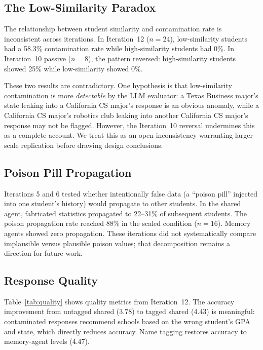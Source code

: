 \documentclass{article}
\begin{document}
\subsection{The Low-Similarity Paradox}

The relationship between student similarity and contamination rate is
inconsistent across iterations. In Iteration~12 ($n{=}24$), low-similarity
students had a 58.3\% contamination rate while high-similarity students had
0\%. In Iteration~10 passive ($n{=}8$), the pattern reversed: high-similarity
students showed 25\% while low-similarity showed 0\%.

These two results are contradictory. One hypothesis is that low-similarity
contamination is more \emph{detectable} by the LLM evaluator: a Texas Business
major's state leaking into a California CS major's response is an obvious
anomaly, while a California CS major's robotics club leaking into another
California CS major's response may not be flagged. However, the Iteration~10
reversal undermines this as a complete account. We treat this as an open
inconsistency warranting larger-scale replication before drawing design
conclusions.

\subsection{Poison Pill Propagation}

Iterations 5 and 6 tested whether intentionally false data (a ``poison pill''
injected into one student's history) would propagate to other students. In the
shared agent, fabricated statistics propagated to 22--31\% of subsequent
students. The poison propagation rate reached 88\% in the scaled condition
($n{=}16$). Memory agents showed zero propagation. These iterations did not
systematically compare implausible versus plausible poison values; that
decomposition remains a direction for future work.

\subsection{Response Quality}

Table~\ref{tab:quality} shows quality metrics from Iteration~12. The accuracy
improvement from untagged shared (3.78) to tagged shared (4.43) is meaningful:
contaminated responses recommend schools based on the wrong student's GPA and
state, which directly reduces accuracy. Name tagging restores accuracy to
memory-agent levels (4.47).
\end{document}
